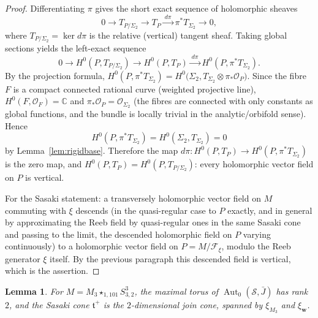\documentclass{amsart}
\newtheorem{lemma}{Lemma}
\theoremstyle{definition}
\DeclareMathOperator{\Aut}{Aut}
\begin{document}
\begin{proof}
Differentiating $\pi$ gives the short exact sequence of holomorphic sheaves
\[
  0 \longrightarrow T_{P/\Sigma_2} \longrightarrow T_P
  \xrightarrow{\ d\pi\ } \pi^*T_{\Sigma_2} \longrightarrow 0 ,
\]
where $T_{P/\Sigma_2}=\ker d\pi$ is the relative (vertical) tangent sheaf. Taking
global sections yields the left-exact sequence
\[
  0 \to H^0(P,T_{P/\Sigma_2}) \to H^0(P,T_P)
  \xrightarrow{\ d\pi\ } H^0(P,\pi^*T_{\Sigma_2}).
\]
By the projection formula,
$H^0(P,\pi^*T_{\Sigma_2})=H^0\!\bigl(\Sigma_2,T_{\Sigma_2}\otimes
\pi_*\mathcal O_P\bigr)$. Since the fibre $F$ is a compact connected rational
curve (weighted projective line), $H^0(F,\mathcal O_F)=\mathbb C$ and
$\pi_*\mathcal O_P=\mathcal O_{\Sigma_2}$ (the fibres are connected with only
constants as global functions, and the bundle is locally trivial in the
analytic/orbifold sense). Hence
\[
  H^0(P,\pi^*T_{\Sigma_2})=H^0(\Sigma_2,T_{\Sigma_2})=0
\]
by Lemma~\ref{lem:rigidbase}. Therefore the map
$d\pi\colon H^0(P,T_P)\to H^0(P,\pi^*T_{\Sigma_2})$ is the zero map, and
$H^0(P,T_P)=H^0(P,T_{P/\Sigma_2})$: every holomorphic vector field on $P$ is
vertical.

For the Sasaki statement: a transversely holomorphic vector field on $M$
commuting with $\xi$ descends (in the quasi-regular case to $P$ exactly, and in
general by approximating the Reeb field by quasi-regular ones in the same Sasaki
cone and passing to the limit, the descended holomorphic field on $P$ varying
continuously) to a holomorphic vector field on $P=M/\mathcal F_\xi$, modulo the
Reeb generator $\xi$ itself. By the previous paragraph this descended field is
vertical, which is the assertion.
\end{proof}

\begin{lemma}\label{lem:cone}
For $M=M_3\star_{1,101}S^3_{3,2}$, the maximal torus of $\Aut_0(\mathcal S,\bar
J)$ has rank $2$, and the Sasaki cone $\mathfrak t^+$ is the $2$-dimensional
join cone, spanned by $\xi_{M_3}$ and $\xi_{\mathbf w}$.
\end{lemma}
\end{document}
